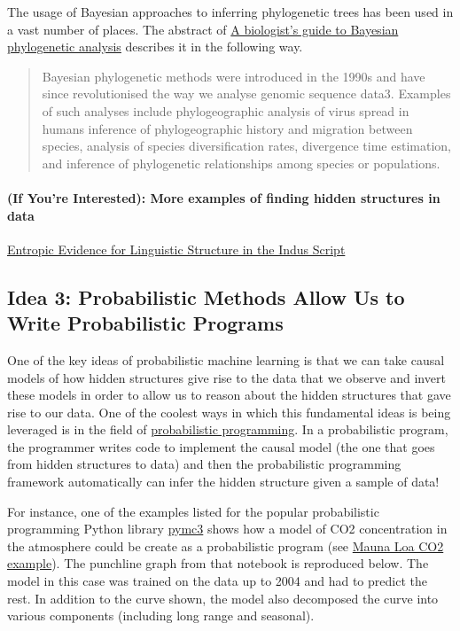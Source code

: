 \documentclass[assignment01_Solutions]{subfiles}
\begin{document}
The usage of Bayesian approaches to inferring phylogenetic trees has been used in a vast number of places.  The abstract of \href{https://www.ncbi.nlm.nih.gov/pmc/articles/PMC5624502/}{A biologist’s guide to Bayesian phylogenetic analysis} describes it in the following way.
\begin{quote}
Bayesian phylogenetic methods were introduced in the 1990s and have since revolutionised the way we analyse genomic sequence data3. Examples of such analyses include phylogeographic analysis of virus spread in humans inference of phylogeographic history and migration between species, analysis of species diversification rates, divergence time estimation, and inference of phylogenetic relationships among species or populations.
\end{quote}

\paragraph{(If You're Interested): More examples of finding hidden structures in data}

\href{https://homes.cs.washington.edu/~rao/ScienceIndus.pdf}{Entropic Evidence for Linguistic Structure in the Indus Script}


\subsection*{Idea 3: Probabilistic Methods Allow Us to Write Probabilistic Programs}

One of the key ideas of probabilistic machine learning is that we can take causal models of how hidden structures give rise to the data that we observe and invert these models in order to allow us to reason about the hidden structures that gave rise to our data.  One of the coolest ways in which this fundamental ideas is being leveraged is in the field of \href{https://en.wikipedia.org/wiki/Probabilistic_programming}{probabilistic programming}.  In a probabilistic program, the programmer writes code to implement the causal model (the one that goes from hidden structures to data) and then the probabilistic programming framework automatically can infer the hidden structure given a sample of data!

For instance, one of the examples listed for the popular probabilistic programming Python library \href{https://docs.pymc.io/}{pymc3} shows how a model of CO2 concentration in the atmosphere could be create as a probabilistic program (see \href{https://docs.pymc.io/notebooks/GP-MaunaLoa.html}{Mauna Loa CO2 example}).  The punchline graph from that notebook is reproduced below. The model in this case was trained on the data up to 2004 and had to predict the rest.  In addition to the curve shown, the model also decomposed the curve into various components (including long range and seasonal).
\end{document}

